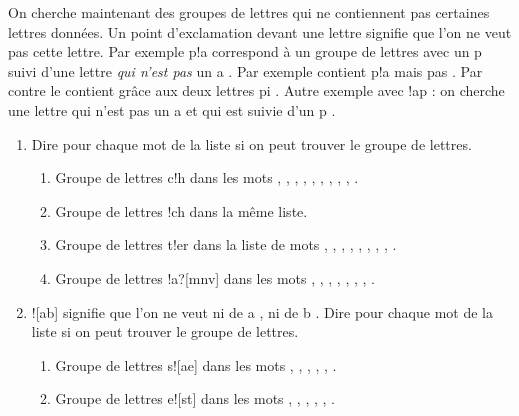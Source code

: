 \documentclass[class=report,crop=false, 12pt]{standalone}
\begin{document}
\begin{activite}

On cherche maintenant des groupes de lettres qui ne contiennent pas certaines lettres données. Un point d'exclamation devant une lettre signifie que l'on ne veut pas cette lettre. Par exemple \og p\!!a \fg{} correspond à un groupe de lettres avec un \og p \fg{} suivi d'une lettre \emph{qui n'est pas} un \og a \fg{}. Par exemple  contient  \og p\!!a \fg{} mais pas . Par contre  le contient grâce aux deux lettres \og pi \fg{}. Autre exemple avec \og \!!ap \fg{} : on cherche une lettre qui n'est pas un \og a \fg{} et qui est suivie d'un \og p \fg{}.


\begin{enumerate}
  \item Dire pour chaque mot de la liste si on peut trouver le groupe de lettres.
  \begin{enumerate}
    \item Groupe de lettres \og c\!!h \fg{} dans les mots , , , , , , , , , .
    \item Groupe de lettres \og \!!ch \fg{} dans la même liste.
    \item Groupe de lettres \og t\!!er \fg{} dans la liste de mots , , , , , , , , .
    \item Groupe de lettres \og [bcf]\!!a\!?[mnv] \fg{} dans les mots , , , , , , , .
  \end{enumerate}  
  
  \item \og \!![ab] \fg{} signifie que l'on ne veut ni de \og a \fg{}, ni de \og b \fg{}. Dire pour chaque mot de la liste si on peut trouver le groupe de lettres.
  \begin{enumerate}
    \item Groupe de lettres \og s\!![ae] \fg{} dans les mots , , , , , .
    \item Groupe de lettres \og [tp]e\!![st] \fg{} dans les mots , , , , , .
  \end{enumerate}

\end{enumerate}
\end{activite}
\end{document}
